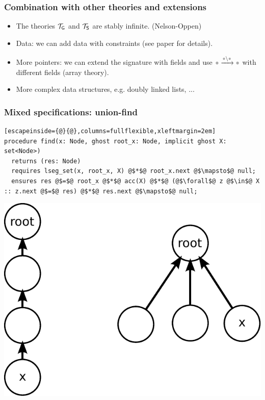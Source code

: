 \documentclass{beamer}
\begin{document}
\begin{frame}
  \frametitle{Combination with other theories and extensions}
  \begin{itemize}
  \item The theories $\mathcal{T}_{\mathsf{G}}$ and $\mathcal{T}_{\mathsf{S}}$ are stably infinite. (Nelson-Oppen)

  \item Data: we can add data with constraints (see paper for details). 

  \item More pointers: we can extend the signature with fields and use $\reachsymf$ with different fields
  (array theory).

  \item More complex data structures, e.g. doubly linked lists, ...


  \end{itemize}
\end{frame}

\begin{frame}[fragile]
  \frametitle{Mixed specifications: union-find}
\begin{lstlisting}[escapeinside={@}{@},columns=fullflexible,xleftmargin=2em]
procedure find(x: Node, ghost root_x: Node, implicit ghost X: set<Node>) 
  returns (res: Node)
  requires lseg_set(x, root_x, X) @$*$@ root_x.next @$\mapsto$@ null;
  ensures res @$=$@ root_x @$*$@ acc(X) @$*$@ (@$\forall$@ z @$\in$@ X :: z.next @$=$@ res) @$*$@ res.next @$\mapsto$@ null;
\end{lstlisting}
  
  \begin{center}
  \includegraphics[scale=0.6]{resources/uf1.pdf}
  \end{center}
\end{frame}
\end{document}
